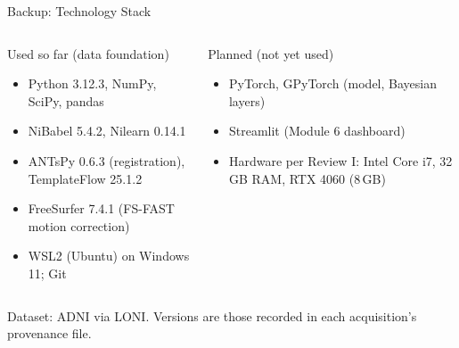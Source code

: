 \documentclass[aspectratio=169,11pt]{beamer}
\begin{document}
\begin{frame}{Backup: Technology Stack}
  \small
  \begin{columns}[T,onlytextwidth]
      \begin{block}{Used so far (data foundation)}
        \footnotesize
        \begin{itemize}
          \item Python 3.12.3, NumPy, SciPy, pandas
          \item NiBabel 5.4.2, Nilearn 0.14.1
          \item ANTsPy 0.6.3 (registration), TemplateFlow 25.1.2
          \item FreeSurfer 7.4.1 (FS-FAST motion correction)
          \item WSL2 (Ubuntu) on Windows 11; Git
        \end{itemize}
      \end{block}
      \begin{block}{Planned (not yet used)}
        \footnotesize
        \begin{itemize}
          \item PyTorch, GPyTorch (model, Bayesian layers)
          \item Streamlit (Module 6 dashboard)
          \item Hardware per Review I: Intel Core i7, 32\,GB RAM, RTX 4060 (8\,GB)
        \end{itemize}
      \end{block}
  \end{columns}
  \vspace{0.2cm}
  {\footnotesize Dataset: ADNI via LONI. Versions are those recorded in each acquisition's provenance file.}
\end{frame}
\end{document}
